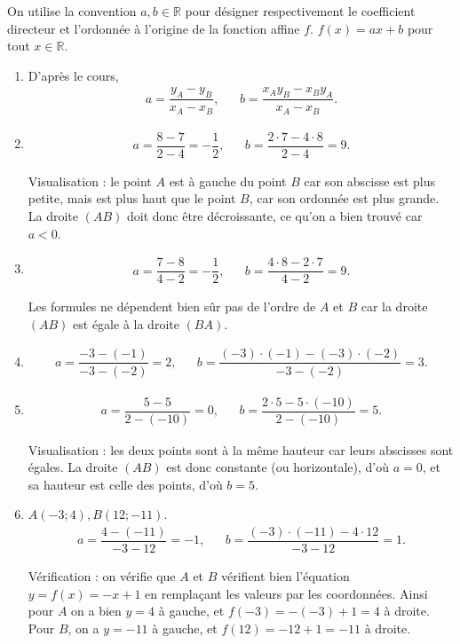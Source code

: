 \documentclass[12pt]{paper}
\theoremstyle{plain}
\theoremstyle{definition}
\newcommand{\R}{\mathbb{R}}
\begin{document}
{
	On utilise la convention $a, b \in \R$ pour désigner respectivement le coefficient directeur et l'ordonnée à l'origine de la fonction affine $f$.
	$f(x) = ax+b$ pour tout $x\in\R$.

	\begin{enumerate}
		\item 
			D'après le cours,
			\begin{align*}
				a = \dfrac{y_A - y_B}{x_A - x_B}, && b = \dfrac{x_A y_B - x_B y_A}{x_A - x_B}.
			\end{align*}
		\item 
			\begin{align*}
				a = \dfrac{8-7}{2-4} = -\dfrac12, && b = \dfrac{2\cdot7 - 4\cdot8}{2-4} = 9.
			\end{align*}
			
			Visualisation : le point $A$ est à gauche du point $B$ car son abscisse est plus petite, mais est plus haut que le point $B$, car son ordonnée est plus grande. 
			La droite $(AB)$ doit donc être décroissante, ce qu'on a bien trouvé car $a<0$.
		\item
			\begin{align*}
				a = \dfrac{7-8}{4-2} = -\dfrac12, && b = \dfrac{4\cdot8 - 2\cdot7}{4-2} = 9.
			\end{align*}
			
		Les formules ne dépendent bien sûr pas de l'ordre de $A$ et $B$ car la droite $(AB)$ est égale à la droite $(BA)$.
					
		\item
			\begin{align*}
				a = \dfrac{-3-(-1)}{-3-(-2)} = 2, && b = \dfrac{(-3)\cdot(-1) - (-3)\cdot(-2)}{-3 - (-2)} = 3.
			\end{align*}
			
		\item
			\begin{align*}
				a = \dfrac{5-5}{2-(-10)} = 0, && b = \dfrac{2\cdot5 - 5 \cdot(-10)}{2-(-10)} = 5.
			\end{align*}
			
			Visualisation : les deux points sont à la même hauteur car leurs abscisses sont égales.
			La droite $(AB)$ est donc constante (ou horizontale), d'où $a=0$, et sa hauteur est celle des points, d'où $b=5$.
			
		\item $A(-3;4), B(12;-11)$.
			\begin{align*}
				a = \dfrac{4-(-11)}{-3-12} = -1, && b = \dfrac{(-3)\cdot(-11) - 4\cdot12}{-3-12} = 1.
			\end{align*}
			
			Vérification : on vérifie que $A$ et $B$ vérifient bien l'équation $y=f(x) = -x +1$ en remplaçant les valeurs par les coordonnées.
			Ainsi pour $A$ on a bien $y=4$ à gauche, et $f(-3) = -(-3) + 1 = 4$ à droite.
			Pour $B$, on a $y=-11$ à gauche, et $f(12) = -12 + 1 = -11$ à droite.
	\end{enumerate}


}
\end{document}

